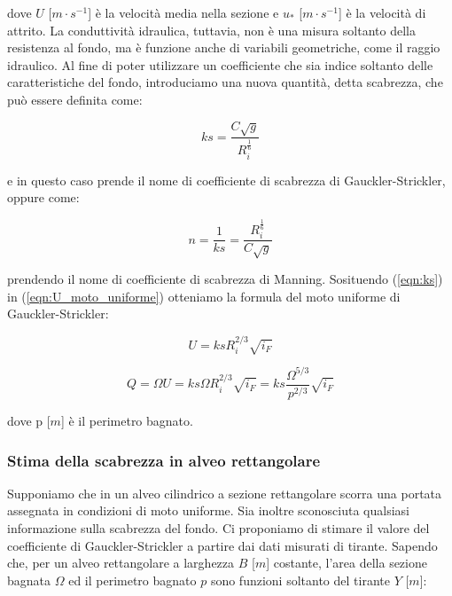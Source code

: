 \documentclass[12pt]{article} %
\begin{document}
\noindent dove $U$ [$m\cdot s^{-1}$] è la velocità media nella sezione e $u_*$ [$m\cdot s^{-1}$] è la velocità di attrito. La conduttività idraulica, tuttavia, non è una misura soltanto della resistenza al fondo, ma è funzione anche di variabili geometriche, come il raggio idraulico. Al fine di poter utilizzare un coefficiente che sia indice soltanto delle caratteristiche del fondo, introduciamo una nuova quantità, detta scabrezza, che può essere definita come:

\begin{equation}
    ks=\frac{C\sqrt{g}}{R_i^\frac{1}{6}}
    \label{eqn:ks}
\end{equation}

\noindent e in questo caso prende il nome di coefficiente di scabrezza di Gauckler-Strickler, oppure come:

\begin{equation}
    n=\frac{1}{ks}=\frac{R_i^\frac{1}{6}}{C\sqrt{g}}
    \label{eqn:n_Manning}
\end{equation}

\noindent prendendo il nome di coefficiente di scabrezza di Manning. Sosituendo (\ref{eqn:ks}) in (\ref{eqn:U_moto_uniforme}) otteniamo la formula del moto uniforme di Gauckler-Strickler:

\begin{equation}
    U=ksR_i^{2/3}\sqrt{i_F}
    \label{eqn:U_Gauckler-Strickler}
\end{equation}

\begin{equation}
    Q= \Omega U = ks\Omega R_i^{2/3}\sqrt{i_F} =ks\frac{\Omega^{5/3}}{p^{2/3}}\sqrt{i_F}
    \label{eqn:Q_Gauckler-Strickler}
\end{equation}

\noindent dove p [$m$] è il perimetro bagnato.

\subsubsection{Stima della scabrezza in alveo rettangolare}

\noindent Supponiamo che in un alveo cilindrico a sezione rettangolare scorra una portata assegnata in condizioni di moto uniforme. Sia inoltre sconosciuta qualsiasi informazione sulla scabrezza del fondo. Ci proponiamo di stimare il valore del coefficiente di Gauckler-Strickler a partire dai dati misurati di tirante. Sapendo che, per un alveo rettangolare a larghezza $B$ [$m$] costante, l'area della sezione bagnata $\Omega$ ed il perimetro bagnato $p$ sono funzioni soltanto del tirante $Y$ [$m$]:
\end{document}
